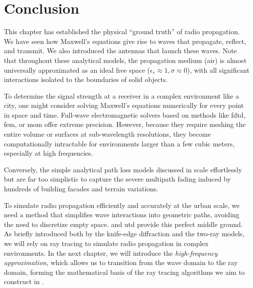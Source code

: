 \section{Conclusion}

This chapter has established the physical \enquote{ground truth} of radio propagation. We have seen how Maxwell's equations give rise to waves that propagate, reflect, and transmit. We also introduced the antennas that launch these waves. Note that throughout these analytical models, the propagation medium (air) is almost universally approximated as an ideal \gls{free space} ($\epsilon_r \approx 1, \sigma \approx 0$), with all significant interactions isolated to the boundaries of solid objects.

To determine the signal strength at a receiver in a complex environment like a city, one might consider solving Maxwell's equations numerically for every point in space and time. Full-wave electromagnetic solvers based on methods like \gls{fdtd}, \gls{fem}, or \gls{mom} offer extreme precision. However, because they require meshing the entire volume or surfaces at sub-\gls{wavelength} resolutions, they become computationally intractable for environments larger than a few cubic meters, especially at high frequencies.

Conversely, the simple analytical path loss models discussed in  scale effortlessly but are far too simplistic to capture the severe multipath fading induced by hundreds of building facades and terrain variations.

To simulate radio propagation efficiently and accurately at the urban scale, we need a method that simplifies wave interactions into geometric paths, avoiding the need to discretize empty space.  and \gls{utd} provide this perfect middle ground. As briefly introduced both by the knife-edge diffraction and the two-ray models, we will rely on ray tracing to simulate radio propagation in complex environments. In the next chapter, we will introduce the \emph{high-frequency approximation}, which allows us to transition from the wave domain to the ray domain, forming the mathematical basis of the ray tracing algorithms we aim to construct in .
